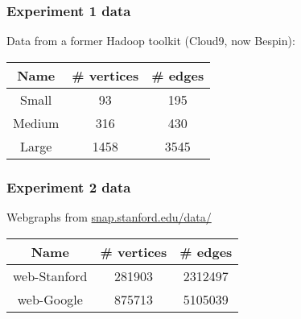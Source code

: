 \begin{frame}
\frametitle{Experiment 1 data}
Data from a former Hadoop toolkit (Cloud9, now Bespin):
\begin{table}
\centering
\begin{tabular}{|c|c|c|}
\hline
Name & \# vertices & \# edges\\
\hline
Small & 93 & 195\\
\hline
Medium & 316 & 430\\
\hline
Large & 1458 & 3545\\
\hline
\end{tabular}
\end{table}
\end{frame}

\begin{frame}
\frametitle{Experiment 2 data}
Webgraphs from \url{snap.stanford.edu/data/}
\begin{table}
\centering
\begin{tabular}{|c|c|c|}
\hline
Name & \# vertices & \# edges\\
\hline
web-Stanford & 281903 & 2312497\\
\hline
web-Google & 875713 & 5105039\\
\hline
\end{tabular}
\end{table}
\end{frame}
